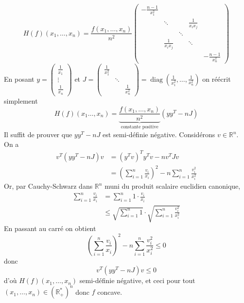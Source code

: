 \documentclass{report}
\DeclareMathOperator{\diag}{diag}
\begin{document}
\[
   H(f)(x_1,\ldots,x_n) = \frac{f(x_1,\ldots, x_n)}{n^2} \left(
    \begin{array}{ccccc}
    -\frac{n-1}{x_1^2}                                    \\
      & \ddots             &   & \frac{1}{x_i x_j}\\
      &               & \ddots                \\
      & \frac{1}{x_i x_j} &   & \ddots            \\
      &               &   &   & -\frac{n-1}{x_n^2}
    \end{array}
    \right)
\]  
En posant $y=\begin{pmatrix}
\frac 1{x_1}\\
\vdots\\
\frac 1{x_n}
\end{pmatrix}$ et $J=\begin{pmatrix}
\frac 1{x_1^2} \\
& \ddots \\
&& \frac 1{x_n^2}
\end{pmatrix}=\diag(\frac 1{x_1^2},\ldots,\frac 1{x_n^2})$ \newline
on réécrit simplement $$H(f)(x_1\ldots,x_n)=\underbrace{\frac{f(x_1,\ldots, x_n)}{n^2}}_{\text{constante positive}}(yy^T-nJ)$$
Il suffit de prouver que $yy^T-nJ$ est semi-définie négative. Considérons $v\in \mathbb R^n$.
On a $$\begin{aligned}
v^T(yy^T-nJ)v &= (y^Tv)^Ty^Tv-nv^TJv\\
&= \left(\sum_{i=1}^n \frac{v_i}{x_i}\right)^2 - n \sum_{i=1}^n \frac{v_i^2}{x_i^2}
\end{aligned}$$
Or, par Cauchy-Schwarz dans $\mathbb R^n$ muni du produit scalaire euclidien canonique,
$$\begin{aligned} \sum_{i=1}^n \frac{v_i}{x_i} &= \sum_{i=1}^n 1\cdot \frac{v_i}{x_i}\\
&\leq \sqrt{\sum_{i=1}^n 1} \cdot \sqrt{\sum_{i=1}^n \frac{v_i^2}{x_i^2}}
\end{aligned}$$
En passant au carré on obtient $$\left(\sum_{i=1}^n \frac{v_i}{x_i}\right)^2 - n \sum_{i=1}^n \frac{v_i^2}{x_i^2}\leq 0$$ donc $$v^T(yy^T-nJ)v\leq 0$$ d'où $H(f)(x_1,\ldots,x_n)$ semi-définie négative, et ceci pour tout $(x_1,\ldots,x_n)\in (\mathbb R^*_+)^n $ donc $f$ concave.
\end{document}
